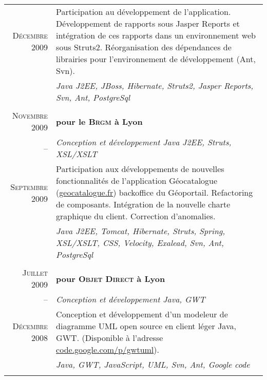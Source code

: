 \documentclass[a4paper,10pt]{article}
\begin{document}
\begin{supertabular}{r|p{11cm}}
  \footnotesize{\textsc{Décembre 2009}}  & \footnotesize{Participation au développement de l'application. Développement de rapports sous Jasper Reports et intégration de ces rapports dans un environnement web sous Struts2. Réorganisation des dépendances de librairies pour l'environnement de développement (Ant, Svn).} \\
  & \emph{Java J2EE, JBoss, Hibernate, Struts2, Jasper Reports, Svn, Ant, PostgreSql}                                    \\
                                                                                                     \\
  \textsc{Novembre 2009} & \textbf{pour le \textsc{Brgm} à Lyon}                                                         \\ 
  -- & \emph{Conception et développement Java J2EE, Struts, XSL/XSLT}                                                    \\
  \footnotesize{\textsc{Septembre 2009}} & \footnotesize{Participation aux développements de nouvelles fonctionnalités de l'application Géocatalogue (\href{http://www.geocatalogue.fr}{geocatalogue.fr}) backoffice du Géoportail. Refactoring de composants. Intégration de la nouvelle charte graphique du client. Correction d'anomalies.} \\
  & \emph{Java J2EE, Tomcat, Hibernate, Struts, Spring, XSL/XSLT, CSS, Velocity, Exalead, Svn, Ant, PostgreSql}          \\
                                                                                                     \\
  \textsc{Juillet 2009} & \textbf{pour \textsc{Objet Direct} à Lyon}                                                     \\
  -- & \emph{Conception et développement Java, GWT}                                                                      \\
  \footnotesize{\textsc{Décembre 2008}}& \footnotesize{Conception et développement d’un modeleur de diagramme UML open source en client léger Java, GWT.  (Disponible à l'adresse \href{http://code.google.com/p/gwtuml/}{code.google.com/p/gwtuml}).} \\
  & \emph{Java, GWT, JavaScript, UML, Svn, Ant, Google code}                                                             \\
                                                                                                     \\

\end{supertabular}
\end{document}
